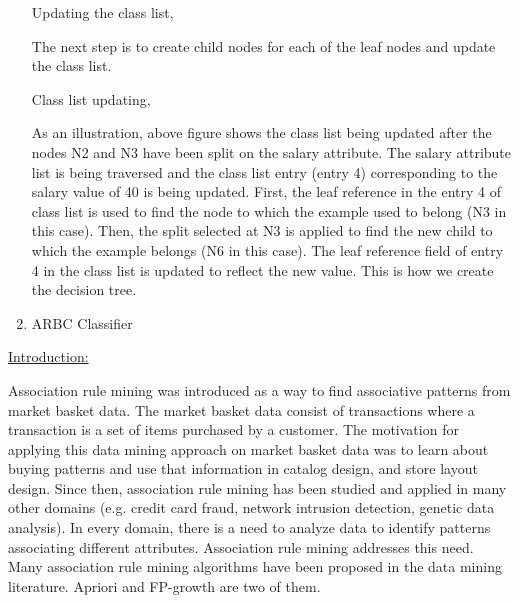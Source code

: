 \documentclass[12pt]{article}
\renewcommand{\_}{\kern-1.5pt\textunderscore\kern-1.5pt}
\begin{document}
\begin{enumerate}
Updating the class list, \par

The next step is to create child nodes for each of the leaf nodes and update the class list.\par

Class list updating, \par

\par

As an illustration, above figure shows the class list being updated after the nodes N2 and N3 have been split on the salary attribute. The salary attribute list is being traversed and the class list entry (entry 4) corresponding to the salary value of 40 is being updated. First, the leaf reference in the entry 4 of class list is used to find the node to which the example used to belong (N3 in this case). Then, the split selected at N3 is applied to find the new child to which the example belongs (N6 in this case). The leaf reference field of entry 4 in the class list is updated to reflect the new value. This is how we create the decision tree.\par


\vspace{\baselineskip}

\vspace{\baselineskip}
	\item {\fontsize{20pt}{24.0pt}\selectfont ARBC Classifier\par}
\end{enumerate}\par

{\fontsize{14pt}{16.8pt}\selectfont \uline{Introduction:}\par}\par

Association rule mining was introduced as a way to find associative patterns from market basket data. The market basket data consist of transactions where a transaction is a set of items purchased by a customer. The motivation for applying this data mining approach on market basket data was to learn about buying patterns and use that information in catalog design, and store layout design. Since then, association rule mining has been studied and applied in many other domains (e.g. credit card fraud, network intrusion detection, genetic data analysis). In every domain, there is a need to analyze data to identify patterns associating different attributes. Association rule mining addresses this need. Many association rule mining algorithms have been proposed in the data mining literature. Apriori and FP-growth are two of them.\par
\end{document}
